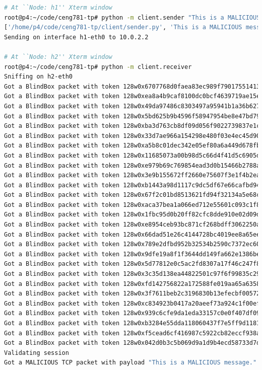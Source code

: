 \documentclass{winslabreport}
\begin{document}
\begin{lstlisting}[caption={A Malicious Message},label={lst:resultmalicious},language=bash]
# At ``Node: h1'' Xterm window
root@p4:~/code/ceng781-tp# python -m client.sender "This is a MALICIOUS message."
['/home/p4/code/ceng781-tp/client/sender.py', 'This is a MALICIOUS message.']
Sending on interface h1-eth0 to 10.0.2.2

# At ``Node: h2'' Xterm window
root@p4:~/code/ceng781-tp# python -m client.receiver
Sniffing on h2-eth0
Got a BlindBox packet with token 128w0x6707768d0faea83ec989f79017551413
Got a BlindBox packet with token 128w0xea8a4b9caf8100dc0bcf4639719ae15e
Got a BlindBox packet with token 128w0x49da97486c8303497a95941b1a36b627
Got a BlindBox packet with token 128w0x5bd625b9b4596f58947954be8e47bd79
Got a BlindBox packet with token 128w0xba3d763cb8df09d056f9022739837e1c
Got a BlindBox packet with token 128w0x33d7ae966a154298e480f03e4ec45d90
Got a BlindBox packet with token 128w0xa5b8c01dec342e05ef80a6a449d678fb
Got a BlindBox packet with token 128w0x11685073a00b98d5c66d4f41d5c6905d
Got a BlindBox packet with token 128w0xe979b69c769854ead3d0b15466b2788a
Got a BlindBox packet with token 128w0x3e9b155672ff2660e75607f3e1f4b2ea
Got a BlindBox packet with token 128w0xb1443a98d1117c9dc5df67e66cafbd94
Got a BlindBox packet with token 128w0x67f2c01bd8513621fd94f32134a5e68c
Got a BlindBox packet with token 128w0xaca37bea1a066ed712e55601c093c1f8
Got a BlindBox packet with token 128w0x1fbc95d0b20ff82cfc8dde910e02d09d
Got a BlindBox packet with token 128w0xe8954ceb93bc871cf268bdff3062250a
Got a BlindBox packet with token 128w0x66dad51e26c4144728bc4019ee8a65ee
Got a BlindBox packet with token 128w0x789e2dfbd952b32534b2590c7372ec60
Got a BlindBox packet with token 128w0x9dfe19a8f1f3644dd149fa662e1386be
Got a BlindBox packet with token 128w0x5d77812e0c5ac2fd8307a17f46c247f8
Got a BlindBox packet with token 128w0x3c35d138ea44822501c97f6f99835c29
Got a BlindBox packet with token 128w0xfd142756822a172588fe019aa65a6358
Got a BlindBox packet with token 128w0x3f7611beb2c3196830b13efecbf00572
Got a BlindBox packet with token 128w0xc834923b0417a20aeef73a924c1f00ef
Got a BlindBox packet with token 128w0x939c6cfe9da1eda33157c0e0f407df09
Got a BlindBox packet with token 128w0xb3284e55dda118060437f7e5ff9d1181
Got a BlindBox packet with token 128w0xf5cead6cf416987c5922cb82eccf938a
Got a BlindBox packet with token 128w0x042d0b3c5b069d9a1d9b4ecd58733d7d
Validating session
Got a MALICIOUS TCP packet with payload "This is a MALICIOUS message."
\end{lstlisting}
\end{document}
